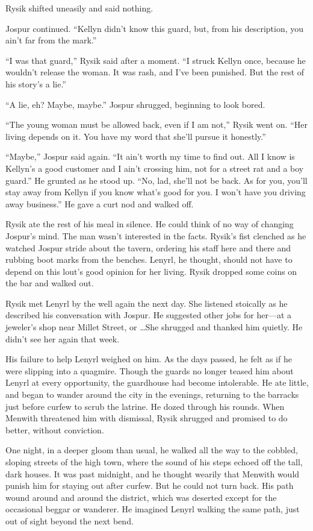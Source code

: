 \documentclass[10pt,a4paper]{article}
\begin{document}
Rysik shifted uneasily and said nothing.

Jospur continued. ``Kellyn didn't know this guard, but, from his
description, you ain't far from the mark.''

``I was that guard,'' Rysik said after a moment. ``I struck Kellyn once,
because he wouldn't release the woman. It was rash, and I've been
punished. But the rest of his story's a lie.''

``A lie, eh? Maybe, maybe.'' Jospur shrugged, beginning to look bored.

``The young woman must be allowed back, even if I am not,'' Rysik
went on. ``Her living depends on it. You have my word that she'll
pursue it honestly.''

``Maybe,'' Jospur said again. ``It ain't worth my time to find out. All
I know is Kellyn's a good customer and I ain't crossing him, not for
a street rat and a boy guard.'' He grunted as he stood up. ``No, lad,
she'll not be back. As for you, you'll stay away from Kellyn if you
know what's good for you. I won't have you driving away business.''
He gave a curt nod and walked off.

Rysik ate the rest of his meal in silence. He could think of no way
of changing Jospur's mind. The man wasn't interested in the facts.
Rysik's fist clenched as he watched Jospur stride about the tavern,
ordering his staff here and there and rubbing boot marks from the
benches. Lenyrl, he thought, should not have to depend on this
lout's good opinion for her living. Rysik dropped some coins on
the bar and walked out.

\bigskip

Rysik met Lenyrl by the well again the next day. She listened
stoically as he described his conversation with Jospur. He suggested
other jobs for her---at a jeweler's shop near Millet Street, or
\ldots\@ She
shrugged and thanked him quietly. He didn't see her again that week.

His failure to help Lenyrl weighed on him. As the days passed, he
felt as if he were slipping into a quagmire. Though the guards no
longer teased him about Lenyrl at every opportunity, the guardhouse
had become intolerable. He ate little, and began to wander around
the city in the evenings, returning to the barracks just before
curfew to scrub the latrine. He dozed through his rounds. When
Menwith threatened him with dismissal, Rysik shrugged and promised
to do better, without conviction.

One night, in a deeper gloom than usual, he walked all the way to
the cobbled, sloping streets of the high town, where the sound of
his steps echoed off the tall, dark houses. It was past midnight,
and he thought wearily that Menwith would punish him for staying out
after curfew. But he could not turn back. His path wound around and
around the district, which was deserted except for the occasional
beggar or wanderer. He imagined Lenyrl walking the same path,
just out of sight beyond the next bend.
\end{document}
